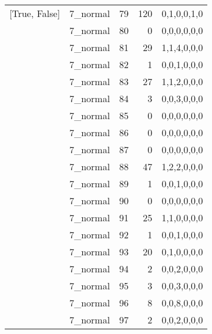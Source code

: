 \begin{tabular}{llrrl}
 [True, False]   & 7\_normal            &            79 &                   120 & 0,1,0,0,1,0   \\
 [True, False]   & 7\_normal            &            80 &                     0 & 0,0,0,0,0,0   \\
 [True, False]   & 7\_normal            &            81 &                    29 & 1,1,4,0,0,0   \\
 [True, False]   & 7\_normal            &            82 &                     1 & 0,0,1,0,0,0   \\
 [True, False]   & 7\_normal            &            83 &                    27 & 1,1,2,0,0,0   \\
 [True, False]   & 7\_normal            &            84 &                     3 & 0,0,3,0,0,0   \\
 [True, False]   & 7\_normal            &            85 &                     0 & 0,0,0,0,0,0   \\
 [True, False]   & 7\_normal            &            86 &                     0 & 0,0,0,0,0,0   \\
 [True, False]   & 7\_normal            &            87 &                     0 & 0,0,0,0,0,0   \\
 [True, False]   & 7\_normal            &            88 &                    47 & 1,2,2,0,0,0   \\
 [True, False]   & 7\_normal            &            89 &                     1 & 0,0,1,0,0,0   \\
 [True, False]   & 7\_normal            &            90 &                     0 & 0,0,0,0,0,0   \\
 [True, False]   & 7\_normal            &            91 &                    25 & 1,1,0,0,0,0   \\
 [True, False]   & 7\_normal            &            92 &                     1 & 0,0,1,0,0,0   \\
 [True, False]   & 7\_normal            &            93 &                    20 & 0,1,0,0,0,0   \\
 [True, False]   & 7\_normal            &            94 &                     2 & 0,0,2,0,0,0   \\
 [True, False]   & 7\_normal            &            95 &                     3 & 0,0,3,0,0,0   \\
 [True, False]   & 7\_normal            &            96 &                     8 & 0,0,8,0,0,0   \\
 [True, False]   & 7\_normal            &            97 &                     2 & 0,0,2,0,0,0   \\

\end{tabular}
